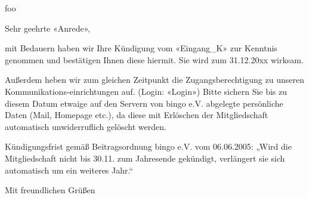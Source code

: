 \documentclass[letterhead]{bingoevletter}
\begin{document}
	\begin{letter}{foo}
	\opening{Sehr geehrte «Anrede»,}

	mit Bedauern haben wir Ihre Kündigung vom «Eingang\_K» zur Kenntnis genommen und bestätigen Ihnen diese hiermit. Sie wird zum 31.12.20xx wirksam. 

	Außerdem heben wir zum gleichen Zeitpunkt die Zugangsberechtigung zu unseren Kommunikations-einrichtungen auf. (Login: «Login») 
	Bitte sichern Sie bis zu diesem Datum etwaige auf den Servern von bingo e.V. abgelegte persönliche Daten (Mail, Homepage etc.), da diese mit Erlöschen der Mitgliedschaft automatisch unwiderruflich gelöscht werden. 


	Kündigungsfrist gemäß Beitragsordnung bingo e.V. vom 06.06.2005: 
	„Wird die Mitgliedschaft nicht bis 30.11. zum Jahresende gekündigt, 
	verlängert sie sich automatisch um ein weiteres Jahr.“ 


	\closing{Mit freundlichen Grüßen}
	\end{letter}
\end{document}
